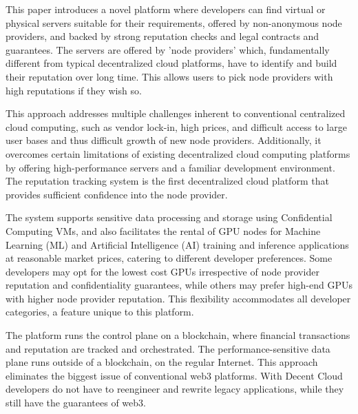 This paper introduces a novel platform where developers can find virtual or physical servers suitable for their requirements, offered by non-anonymous node providers, and backed by strong reputation checks and legal contracts and guarantees. The servers are offered by 'node providers' which, fundamentally different from typical decentralized cloud platforms, have to identify and build their reputation over long time. This allows users to pick node providers with high reputations if they wish so.

This approach addresses multiple challenges inherent to conventional centralized cloud computing, such as vendor lock-in, high prices, and difficult access to large user bases and thus difficult growth of new node providers. Additionally, it overcomes certain limitations of existing decentralized cloud computing platforms by offering high-performance servers and a familiar development environment. The reputation tracking system is the first decentralized cloud platform that provides sufficient confidence into the node provider.

The system supports sensitive data processing and storage using Confidential Computing VMs, and also facilitates the rental of GPU nodes for Machine Learning (ML) and Artificial Intelligence (AI) training and inference applications at reasonable market prices, catering to different developer preferences. Some developers may opt for the lowest cost GPUs irrespective of node provider reputation and confidentiality guarantees, while others may prefer high-end GPUs with higher node provider reputation. This flexibility accommodates all developer categories, a feature unique to this platform.

The platform runs the control plane on a blockchain, where financial transactions and reputation are tracked and orchestrated. The performance-sensitive data plane runs outside of a blockchain, on the regular Internet. This approach eliminates the biggest issue of conventional web3 platforms. With Decent Cloud developers do not have to reengineer and rewrite legacy applications, while they still have the guarantees of web3.

